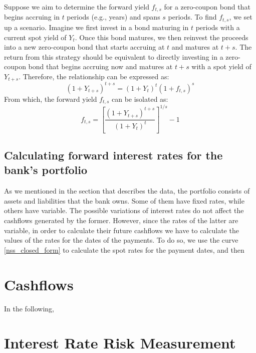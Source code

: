 \documentclass[11pt]{article}
\begin{document}
Suppose we aim to determine the forward yield \(f_{t,s}\) for a zero-coupon bond that begins accruing in \(t\) periods (e.g., years) and spans \(s\) periods. To find \(f_{t,s}\), we set up a scenario. Imagine we first invest in a bond maturing in \(t\) periods with a current spot yield of \(Y_t\). Once this bond matures, we then reinvest the proceeds into a new zero-coupon bond that starts accruing at \(t\) and matures at \(t+s\). The return from this strategy should be equivalent to directly investing in a zero-coupon bond that begins accruing now and matures at \(t+s\) with a spot yield of \(Y_{t+s}\). Therefore, the relationship can be expressed as:
\begin{equation}
(1 + Y_{t+s})^{t+s} = (1 + Y_t)^t(1 + f_{t,s})^s
\end{equation}
From which, the forward yield \(f_{t,s}\) can be isolated as:
\begin{equation}
f_{t,s} = \left[ \frac{(1 + Y_{t+s})^{t+s}}{(1 + Y_t)^t} \right]^{1/s} - 1
\end{equation}

\subsection{Calculating forward interest rates for the bank's portfolio}

As we mentioned in the section that describes the data, the portfolio consists of assets and liabilities that the bank owns. Some of them have fixed rates, while others have variable. The possible variations of interest rates do not affect the cashflows generated by the former. However, since the rates of the latter are variable, in order to calculate their future cashflows we have to calculate the values of the rates for the dates of the payments. To do so, we use the curve \eqref{nss_closed_form} to calculate the spot rates for the payment dates, and then 

\section{Cashflows}

In the following, 


\section{Interest Rate Risk Measurement}
\end{document}
